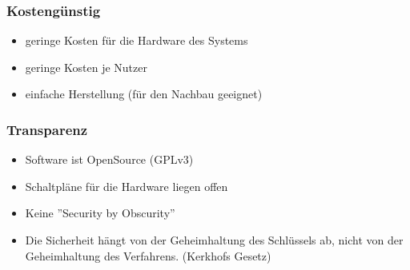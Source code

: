 \begin{frame}
	\frametitle{Kostengünstig}
	\begin{itemize}
		\item<2-> geringe Kosten für die Hardware des Systems
		\item<3-> geringe Kosten je Nutzer
		\item<4-> einfache Herstellung (für den Nachbau geeignet)
	\end{itemize}
\end{frame}
\begin{frame}
	\frametitle{Transparenz}
	\begin{itemize}
		\item<2-> Software ist OpenSource (GPLv3)
		\item<3-> Schaltpläne für die Hardware liegen offen
		\item<4-> Keine ''Security by Obscurity''
		\item<4-> Die Sicherheit hängt von der Geheimhaltung des Schlüssels ab, nicht von der Geheimhaltung des Verfahrens. (Kerkhofs Gesetz)
	\end{itemize}
\end{frame}

